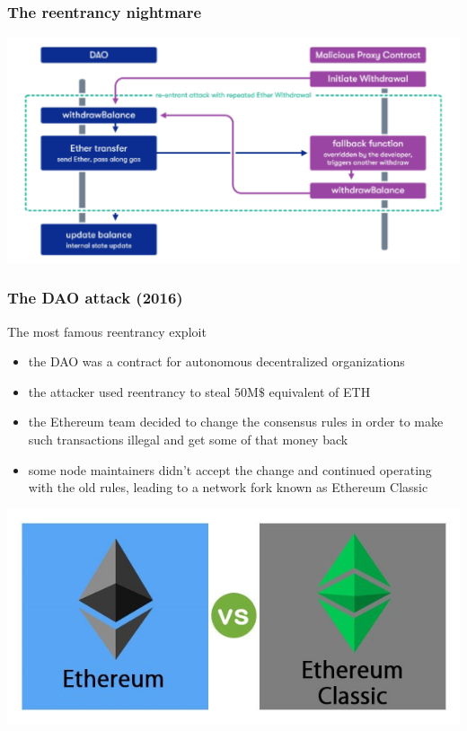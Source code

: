 \documentclass[11pt]{beamer}  %
\begin{document}
\begin{frame}\frametitle{The reentrancy nightmare}

  \begin{center}
    \includegraphics[width=\textwidth,clip=false]{pictures/re-entrancy.png}
  \end{center}

\end{frame}

\begin{frame}\frametitle{The DAO attack (2016)}

  \begin{greenbox}{The most famous reentrancy exploit}
    \begin{itemize}
    \item the DAO was a contract for autonomous decentralized organizations
    \item the attacker used reentrancy to steal $50\text{M}\$$ equivalent of ETH
    \item the Ethereum team decided to change the consensus rules in order
      to make such transactions illegal and get some of that money back
    \item some node maintainers didn't accept the change and continued
      operating with the old rules, leading to a network fork known as
      Ethereum Classic
    \end{itemize}
  \end{greenbox}

  \begin{center}
    \includegraphics[scale=0.5,clip=false]{pictures/ethereum-vs-ethereum-classic.jpg}
  \end{center}

\end{frame}
\end{document}
